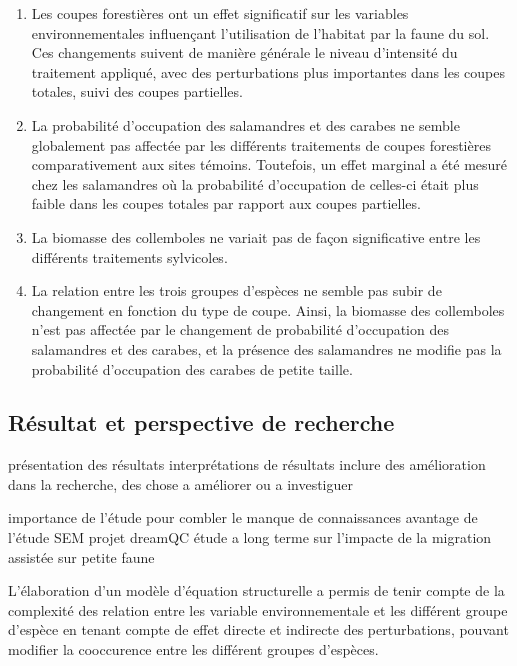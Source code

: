 \begin{enumerate}
  \item Les coupes forestières ont un effet significatif sur les variables environnementales influençant l'utilisation de l'habitat par la faune du sol. Ces changements suivent de manière générale le niveau d'intensité du traitement appliqué, avec des perturbations plus importantes dans les coupes totales, suivi des coupes partielles.
  \item La probabilité d'occupation des salamandres et des carabes ne semble globalement pas affectée par les différents traitements de coupes forestières comparativement aux sites témoins. Toutefois, un effet marginal a été mesuré chez les salamandres où la probabilité d'occupation de celles-ci était plus faible dans les coupes totales par rapport aux coupes partielles.
  \item La biomasse des collemboles ne variait pas de façon significative entre les différents traitements sylvicoles.
  \item La relation entre les trois groupes d'espèces ne semble pas subir de changement en fonction du type de coupe. Ainsi, la biomasse des collemboles n'est pas affectée par le changement de probabilité d'occupation des salamandres et des carabes, et la présence des salamandres ne modifie pas la probabilité d'occupation des carabes de petite taille.
\end{enumerate}



\subsection{Résultat et perspective de recherche}

présentation des résultats
interprétations de résultats
inclure des amélioration dans la recherche, des chose a améliorer ou a investiguer

importance de l'étude pour combler le manque de connaissances
avantage de l'étude
SEM
projet dreamQC étude a long terme sur l'impacte de la migration assistée sur petite faune 


L'élaboration d'un modèle d'équation structurelle a permis de tenir compte de la complexité des relation entre les variable environnementale et les différent groupe d'espèce en tenant compte de effet directe et indirecte des perturbations, pouvant modifier la cooccurence entre les différent groupes d'espèces.

